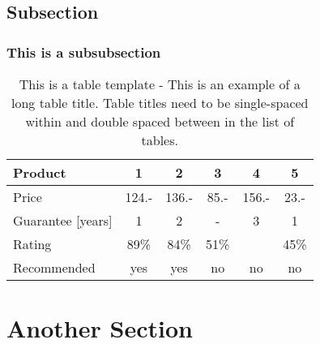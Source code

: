 \subsection{Subsection}
\subsubsection{This is a subsubsection}
\begin{table}[H]
\centering
\caption{This is a table template - This is an example of a long table title.  Table titles need to be single-spaced within and double spaced between in the list of tables.}
\begin{tabular}{|l|c|c|c|c|c|}
\hline
Product & 1 & 2 & 3 & 4 & 5\\
\hline
Price & 124.- & 136.- & 85.- & 156.- & 23.-\\
Guarantee [years] & 1 & 2 & - & 3 & 1\\
Rating & 89\% & 84\% & 51\% & & 45\%\\
\hline
\hline
Recommended & yes & yes & no & no & no\\
\hline
\end{tabular}
\label{tab:template1-2}
\end{table}
\section{Another Section}
